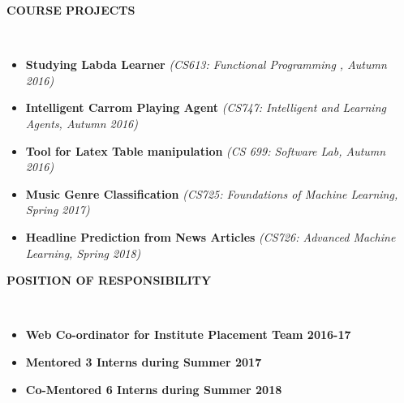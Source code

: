 \documentclass[a4paper,10pt]{article}
\newcommand{\isep}{-2 pt}
\newcommand{\lsep}{-0.5cm}
\newcommand{\resheading}[1]{{\small \colorbox{mygrey}{\begin{minipage}{0.975\textwidth}{\textbf{#1 \vphantom{p\^{E}}}}\end{minipage}}}}
\begin{document}
\resheading{\textbf{COURSE PROJECTS} }\\[\lsep]
\begin{itemize}
\itemsep \isep
	\item \textbf{Studying Labda Learner} \hfill\emph{(CS613: Functional Programming , Autumn 2016)}\\[-0.4cm]
	
	\item \textbf{Intelligent Carrom Playing Agent} \hfill\emph{(CS747: Intelligent and Learning Agents, Autumn 2016)}\\[-0.4cm]
	
	\item \textbf{Tool for Latex Table manipulation} \hfill\emph{(CS 699: Software Lab, Autumn 2016)}\\[-0.4cm]

	\item \textbf{Music Genre Classification} \hfill\emph{(CS725: Foundations of Machine Learning, Spring 2017)}\\[-0.4cm]

	\item \textbf{Headline Prediction from News Articles} \hfill\emph{(CS726: Advanced Machine Learning, Spring 2018)}\\[-0.4cm]

\end{itemize}



 

	


\resheading{\textbf{POSITION OF RESPONSIBILITY} }\\[\lsep]
\begin{itemize} \itemsep \isep
	\item \noindent \textbf{Web Co-ordinator for Institute Placement Team 2016-17} \\[-0.4cm]
	\item \noindent \textbf{Mentored 3 Interns during Summer 2017} \\[-0.4cm]	
	\item \noindent \textbf{Co-Mentored 6 Interns during Summer 2018} \\[-0.4cm]		


\end{itemize}
\end{document}
